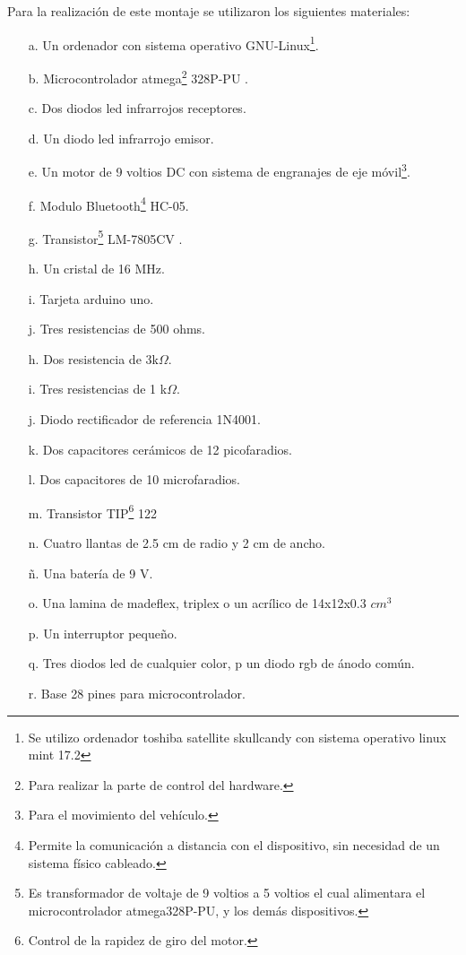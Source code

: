 \documentclass[12]{article}
\begin{document}
\begin{multicols}{2}
Para la realización de este montaje se utilizaron los siguientes materiales:
\begin{enumerate}
\item[a.] Un ordenador con sistema operativo GNU-Linux\footnote{Se utilizo ordenador toshiba satellite skullcandy con sistema operativo linux mint 17.2}.
\item[b.] Microcontrolador atmega\footnote{Para realizar la parte de control del hardware.} 328P-PU \cite{ARDUINO}.
\item[c.] Dos diodos led infrarrojos receptores.
\item[d.] Un diodo led infrarrojo emisor.
\item[e.] Un motor de 9 voltios DC con sistema de engranajes de eje móvil\footnote{Para el movimiento del vehículo.}.
\item[f.] Modulo Bluetooth\footnote{Permite la comunicación a distancia con el dispositivo, sin necesidad de un sistema físico cableado.} HC-05.
\item[g.] Transistor\footnote{Es transformador de voltaje de 9 voltios a 5 voltios el cual alimentara el microcontrolador atmega328P-PU, y los demás dispositivos.} LM-7805CV \cite{REGULADOR}.
\item[h.] Un cristal de 16 MHz.
\item[i.] Tarjeta arduino \cite{ARDUINO} uno.
\item[j.] Tres resistencias de 500 ohms.
\item[h.] Dos resistencia de 3k$\Omega$.
\item[i.] Tres resistencias de 1 k$\Omega$.
\item[j.] Diodo rectificador de referencia 1N4001. 
\item[k.] Dos capacitores cerámicos de 12 picofaradios.
\item[l.] Dos capacitores de 10 microfaradios.
\item[m.] Transistor TIP\footnote{Control de la rapidez de giro del motor.} 122\cite{TIP122}  
\item[n.] Cuatro llantas de 2.5 cm de radio y 2 cm de ancho.
\item[ñ.] Una batería de 9 V.
\item[o.] Una lamina de madeflex, triplex  o un acrílico de 14x12x0.3 $cm^{3}$
\item[p.] Un interruptor pequeño.
\item[q.] Tres diodos led de cualquier color, p un diodo rgb de ánodo común.
\item[r.] Base 28 pines para microcontrolador.
\end{enumerate}


\end{multicols}
\end{document}
